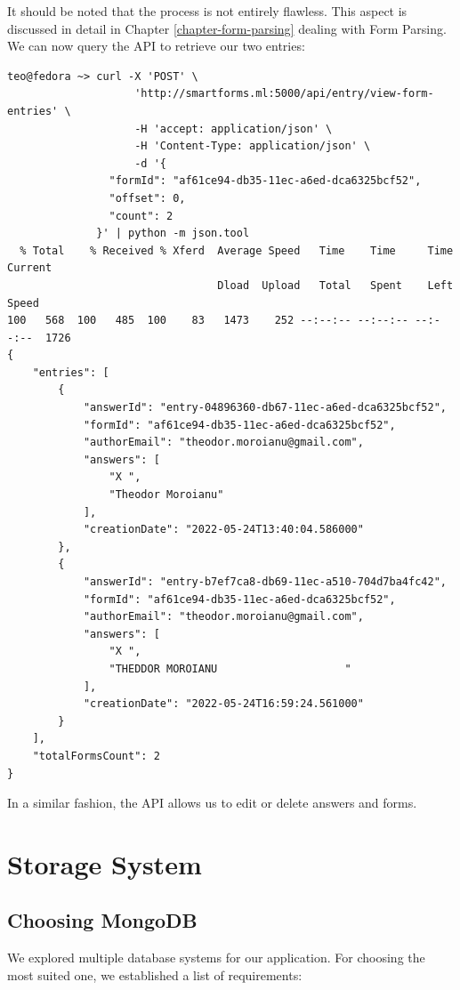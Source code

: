 \documentclass[11pt, a4paper]{report}
\begin{document}
It should be noted that the process is not entirely flawless. This aspect is discussed in  detail in Chapter \ref{chapter-form-parsing} dealing with Form Parsing.
\\


We can now query the API to retrieve our two entries:

\begin{verbatim}
teo@fedora ~> curl -X 'POST' \
                    'http://smartforms.ml:5000/api/entry/view-form-entries' \
                    -H 'accept: application/json' \
                    -H 'Content-Type: application/json' \
                    -d '{
                "formId": "af61ce94-db35-11ec-a6ed-dca6325bcf52",
                "offset": 0,
                "count": 2
              }' | python -m json.tool
  % Total    % Received % Xferd  Average Speed   Time    Time     Time  Current
                                 Dload  Upload   Total   Spent    Left  Speed
100   568  100   485  100    83   1473    252 --:--:-- --:--:-- --:--:--  1726
{
    "entries": [
        {
            "answerId": "entry-04896360-db67-11ec-a6ed-dca6325bcf52",
            "formId": "af61ce94-db35-11ec-a6ed-dca6325bcf52",
            "authorEmail": "theodor.moroianu@gmail.com",
            "answers": [
                "X ",
                "Theodor Moroianu"
            ],
            "creationDate": "2022-05-24T13:40:04.586000"
        },
        {
            "answerId": "entry-b7ef7ca8-db69-11ec-a510-704d7ba4fc42",
            "formId": "af61ce94-db35-11ec-a6ed-dca6325bcf52",
            "authorEmail": "theodor.moroianu@gmail.com",
            "answers": [
                "X ",
                "THEDDOR MOROIANU                    "
            ],
            "creationDate": "2022-05-24T16:59:24.561000"
        }
    ],
    "totalFormsCount": 2
}
\end{verbatim}

In a similar fashion, the API allows us to edit or delete answers and forms.


\chapter{Storage System}
\label{chapter-storage-system}

\section{Choosing MongoDB}
We explored multiple database systems for our application. For choosing the most suited one, we established a list of requirements:
\end{document}
